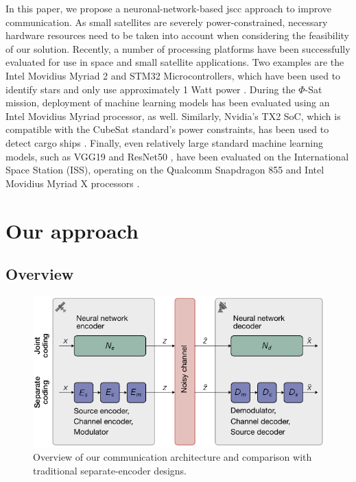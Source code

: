 \documentclass[conference]{IEEEtran}
\begin{document}
In this paper, we propose a neuronal-network-based \ac{jscc} approach to improve communication.
As small satellites are severely power-constrained, necessary hardware resources need to be taken into account when considering the feasibility of our solution.
Recently, a number of processing platforms have been successfully evaluated for use in space and small satellite applications.
Two examples are the Intel Movidius Myriad 2 and STM32 Microcontrollers, which have been used to identify stars and only use approximately 1 Watt power \cite{8556744}.
During the $\Phi$-Sat mission, deployment of machine learning models has been evaluated using an Intel Movidius Myriad processor, as well.
Similarly, Nvidia's TX2 SoC, which is compatible with the CubeSat standard's power constraints, has been used to detect cargo ships \cite{8556744}.
Finally, even relatively large standard machine learning models, such as VGG19 \cite{DBLP:journals/corr/SimonyanZ14a} and ResNet50 \cite{7780459}, have been evaluated on the International Space Station (ISS), operating on the Qualcomm Snapdragon 855 and Intel Movidius Myriad X processors \cite{9884906}.


\section{Our approach}
\label{sec:our_approach}

\subsection{Overview}

\begin{figure}
  \includegraphics[width=\linewidth]{figures/coding-decoding}

  \caption{Overview of our communication architecture and comparison with traditional separate-encoder designs.}
  \label{fig:overview}
\end{figure}
\end{document}
